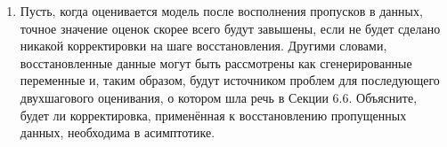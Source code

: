 \begin{enumerate}
\item Пусть, когда оценивается модель после восполнения пропусков в данных, точное значение оценок скорее всего будут завышены, если не будет сделано никакой корректировки на шаге восстановления. Другими словами, восстановленные данные могут быть рассмотрены как сгенерированные переменные и, таким образом, будут источником проблем для последующего двухшагового оценивания, о котором шла речь в Секции 6.6. Объясните, будет ли корректировка, применённая к восстановлению пропущенных данных, необходима в асимптотике.

\end{enumerate}



